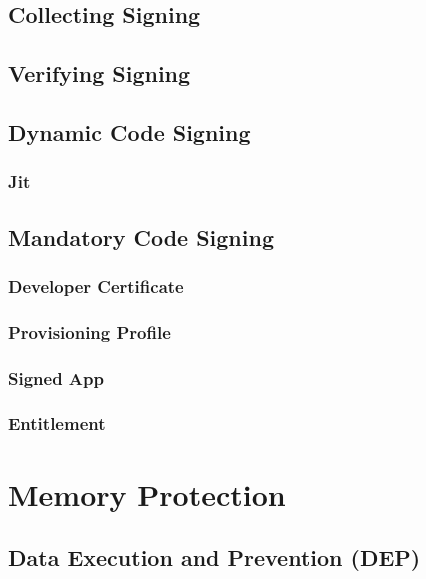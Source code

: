 \subsection{Collecting Signing}
\label{sec:CollectingSigning}

\subsection{Verifying Signing}
\label{sec:VerifyingSigning}

\subsection{Dynamic Code Signing}
\label{sec:DynamicCodeSigning}
\subsubsection{Jit}
\label{sec:Jit}

\subsection{Mandatory Code Signing}
\label{sec:MandatoryCodeSigning}
\subsubsection{Developer Certificate}
\label{sec:DeveloperCertificate}
\subsubsection{Provisioning Profile}
\label{sec:ProvisioningProfile}
\subsubsection{Signed App}
\label{sec:SignedApp}
\subsubsection{Entitlement}
\label{sec:Entitlement}

\section{Memory Protection}
\label{sec:MemoryProtection}
\subsection{Data Execution and Prevention (DEP)}
\label{sec:DEP}
